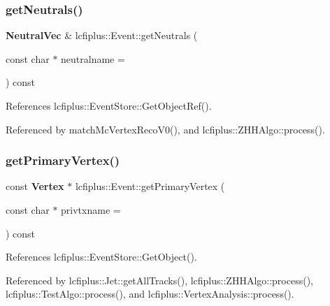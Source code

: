 \mbox{\label{classlcfiplus_1_1Event_a2327801662cdbd8b09e1dcc4a39968e7}} 
\subsubsection{get\+Neutrals()}
{\footnotesize\ttfamily \textbf{ Neutral\+Vec} \& lcfiplus\+::\+Event\+::get\+Neutrals (\begin{DoxyParamCaption}\item[{const char $\ast$}]{neutralname = {} }\end{DoxyParamCaption}) const}



References lcfiplus\+::\+Event\+Store\+::\+Get\+Object\+Ref().



Referenced by match\+Mc\+Vertex\+Reco\+V0(), and lcfiplus\+::\+Z\+H\+H\+Algo\+::process().

\mbox{\label{classlcfiplus_1_1Event_af426826c87899c58c2d8675634717efa}} 
\subsubsection{get\+Primary\+Vertex()}
{\footnotesize\ttfamily const \textbf{ Vertex} $\ast$ lcfiplus\+::\+Event\+::get\+Primary\+Vertex (\begin{DoxyParamCaption}\item[{const char $\ast$}]{privtxname = {} }\end{DoxyParamCaption}) const}



References lcfiplus\+::\+Event\+Store\+::\+Get\+Object().



Referenced by lcfiplus\+::\+Jet\+::get\+All\+Tracks(), lcfiplus\+::\+Z\+H\+H\+Algo\+::process(), lcfiplus\+::\+Test\+Algo\+::process(), and lcfiplus\+::\+Vertex\+Analysis\+::process().

\mbox{\label{classlcfiplus_1_1Event_a9a9eab7dac50f9c51229f027b2f9ad7c}} 
